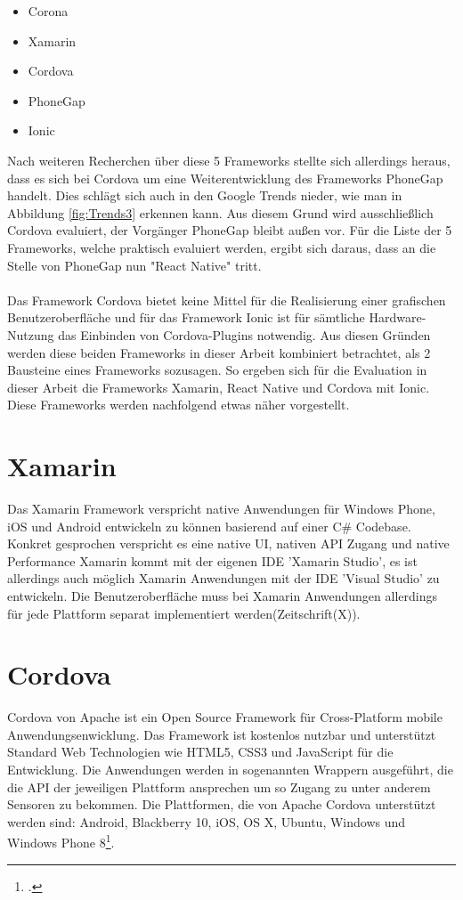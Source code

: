 \begin{itemize}
\item Corona
\item Xamarin
\item Cordova
\item PhoneGap
\item Ionic
\end{itemize}
Nach weiteren Recherchen über diese 5 Frameworks stellte sich allerdings heraus, dass es sich bei Cordova um eine Weiterentwicklung des Frameworks PhoneGap handelt. Dies schlägt sich auch in den Google Trends nieder, wie man in Abbildung \ref{fig:Trends3} erkennen kann. Aus diesem Grund wird ausschließlich Cordova evaluiert, der Vorgänger PhoneGap bleibt außen vor. Für die Liste der 5 Frameworks, welche praktisch evaluiert werden, ergibt sich daraus, dass an die Stelle von PhoneGap nun "React Native" tritt. 
\\
\\
Das Framework Cordova bietet keine Mittel für die Realisierung einer grafischen Benutzeroberfläche und für das Framework Ionic ist für sämtliche Hardware-Nutzung das Einbinden von Cordova-Plugins notwendig. Aus diesen Gründen werden diese beiden Frameworks in dieser Arbeit kombiniert betrachtet, als 2 Bausteine eines Frameworks sozusagen. So ergeben sich für die Evaluation in dieser Arbeit die Frameworks Xamarin, React Native und Cordova mit Ionic. Diese Frameworks werden nachfolgend etwas näher vorgestellt. 

\section{Xamarin}

Das Xamarin Framework verspricht native Anwendungen für Windows Phone, iOS und Android entwickeln zu können basierend auf einer C\# Codebase. Konkret gesprochen verspricht es eine native UI, nativen API Zugang und native Performance Xamarin kommt mit der eigenen IDE 'Xamarin Studio', es ist allerdings auch möglich Xamarin Anwendungen mit der IDE 'Visual Studio' zu entwickeln. Die Benutzeroberfläche muss bei Xamarin Anwendungen allerdings für jede Plattform separat implementiert werden(Zeitschrift(X)). 

\section{Cordova} \label{chpCordova}

Cordova von Apache ist ein Open Source Framework für Cross-Platform mobile Anwendungsenwicklung. Das Framework ist kostenlos nutzbar und unterstützt Standard Web Technologien wie HTML5, CSS3 und JavaScript für die Entwicklung. Die Anwendungen werden in sogenannten Wrappern ausgeführt, die die API der jeweiligen Plattform ansprechen um so Zugang zu unter anderem Sensoren zu bekommen. Die Plattformen, die von Apache Cordova unterstützt werden sind: Android, Blackberry 10, iOS, OS X, Ubuntu, Windows und Windows Phone 8\footcite{Cordova}. 

